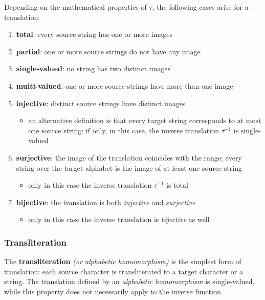 \documentclass[english]{article}
\begin{document}
\bigskip
Depending on the mathematical properties of \(\tau\), the following cases arise for a translation:

\begin{enumerate}
  \item \textbf{total}: every source string has one or more images
  \item \textbf{partial}: one or more source strings do not have any image
  \item \textbf{single-valued}: no string has two distinct images
  \item \textbf{multi-valued}: one or more source strings have more than one image
  \item \textbf{injective}: distinct source strings have distinct images
        \begin{itemize}[label=\(\rightarrow\)]
          \item an alternative definition is that every target string corresponds to at most one source string: if only, in this case, the inverse translation \(\tau^{-1}\) is single-valued
        \end{itemize}
  \item \textbf{surjective}: the image of the translation coincides with the range; every string over the target alphabet is the image of at least one source string
        \begin{itemize}[label=\(\rightarrow\)]
          \item only in this case the inverse translation \(\tau^{-1}\) is total
        \end{itemize}
  \item \textbf{bijective}: the translation is both \textit{injective} and \textit{surjective}
        \begin{itemize}[label=\(\rightarrow\)]
          \item only in this case the inverse translation is \textit{bijective} as well
        \end{itemize}
\end{enumerate}

\subsubsection{Transliteration}

The \textbf{transliteration} \textit{(or alphabetic homomorphism)} is the simplest form of translation:
each source character is transliterated to a target character or a string.
The translation defined by an \textit{alphabetic homomorphism} is single-valued, while this property does not necessarily apply to the inverse function.
\end{document}
